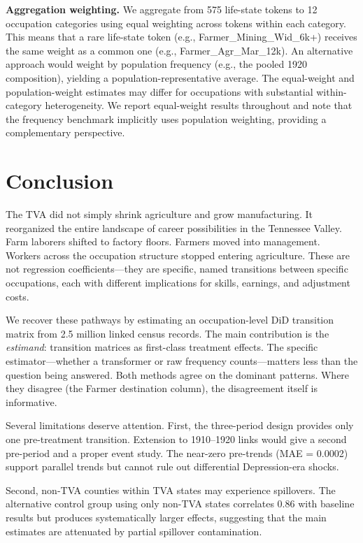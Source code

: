 \documentclass[12pt]{article}
\begin{document}
\textbf{Aggregation weighting.} We aggregate from 575 life-state tokens to 12 occupation categories using equal weighting across tokens within each category. This means that a rare life-state token (e.g., Farmer\_Mining\_Wid\_6k+) receives the same weight as a common one (e.g., Farmer\_Agr\_Mar\_12k). An alternative approach would weight by population frequency (e.g., the pooled 1920 composition), yielding a population-representative average. The equal-weight and population-weight estimates may differ for occupations with substantial within-category heterogeneity. We report equal-weight results throughout and note that the frequency benchmark implicitly uses population weighting, providing a complementary perspective.


\section{Conclusion}
\label{sec:conclusion}

The TVA did not simply shrink agriculture and grow manufacturing. It reorganized the entire landscape of career possibilities in the Tennessee Valley. Farm laborers shifted to factory floors. Farmers moved into management. Workers across the occupation structure stopped entering agriculture. These are not regression coefficients---they are specific, named transitions between specific occupations, each with different implications for skills, earnings, and adjustment costs.

We recover these pathways by estimating an occupation-level DiD transition matrix from 2.5 million linked census records. The main contribution is the \textit{estimand}: transition matrices as first-class treatment effects. The specific estimator---whether a transformer or raw frequency counts---matters less than the question being answered. Both methods agree on the dominant patterns. Where they disagree (the Farmer destination column), the disagreement itself is informative.

Several limitations deserve attention. First, the three-period design provides only one pre-treatment transition. Extension to 1910--1920 links would give a second pre-period and a proper event study. The near-zero pre-trends (MAE = 0.0002) support parallel trends but cannot rule out differential Depression-era shocks.

Second, non-TVA counties within TVA states may experience spillovers. The alternative control group using only non-TVA states correlates 0.86 with baseline results but produces systematically larger effects, suggesting that the main estimates are attenuated by partial spillover contamination.
\end{document}
